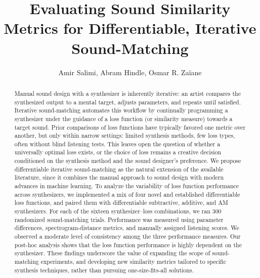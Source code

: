 \documentclass[lettersize,journal]{IEEEtran}
\providecommand{\DIFaddbegin}{} %
\providecommand{\DIFaddend}{} %
\providecommand{\DIFdelbegin}{} %
\providecommand{\DIFdelend}{} %
\providecommand{\DIFscaledelfig}{0.5}
\newlength{\DIFdelgraphicswidth} %
\newlength{\DIFdelgraphicsheight} %
\providecommand{\DIFaddincludegraphics}[2][]{{\color{blue}\fbox{\DIFOincludegraphics[#1]{#2}}}} %
\providecommand{\DIFdelincludegraphics}[2][]{%
\sbox{\DIFdelgraphicsbox}{\DIFOincludegraphics[#1]{#2}}%
\settoboxwidth{\DIFdelgraphicswidth}{\DIFdelgraphicsbox} %
\settoboxtotalheight{\DIFdelgraphicsheight}{\DIFdelgraphicsbox} %
\scalebox{\DIFscaledelfig}{%
\parbox[b]{\DIFdelgraphicswidth}{\usebox{\DIFdelgraphicsbox}\\[-\baselineskip] \rule{\DIFdelgraphicswidth}{0em}}\llap{\resizebox{\DIFdelgraphicswidth}{\DIFdelgraphicsheight}{%
\setlength{\unitlength}{\DIFdelgraphicswidth}%
\begin{picture}(1,1)%
\thicklines\linethickness{2pt} %
{\color[rgb]{1,0,0}\put(0,0){\framebox(1,1){}}}%
{\color[rgb]{1,0,0}\put(0,0){\line( 1,1){1}}}%
{\color[rgb]{1,0,0}\put(0,1){\line(1,-1){1}}}%
\end{picture}%
}\hspace*{3pt}}} %
} %
\DeclareRobustCommand{\DIFaddbegin}{\DIFOaddbegin \let\includegraphics\DIFaddincludegraphics} %
\DeclareRobustCommand{\DIFaddend}{\DIFOaddend \let\includegraphics\DIFOincludegraphics} %
\DeclareRobustCommand{\DIFdelbegin}{\DIFOdelbegin \let\includegraphics\DIFdelincludegraphics} %
\DeclareRobustCommand{\DIFdelend}{\DIFOaddend \let\includegraphics\DIFOincludegraphics} %
\begin{document}
\DIFaddbegin 


\DIFaddend \title{Evaluating Sound Similarity Metrics for Differentiable, Iterative Sound-Matching}

\author{Amir Salimi, Abram Hindle, Osmar R. Za{\"i}ane}
\DIFdelbegin %



\DIFdelend \maketitle

 
\begin{abstract}
Manual sound design with a synthesizer is inherently iterative: an artist compares the synthesized output to a mental target, adjusts parameters, and repeats until satisfied. Iterative sound-matching automates this workflow by continually programming a synthesizer under the guidance of a loss function (or similarity measure) towards a target sound. Prior comparisons of loss functions have typically favored one metric over another, but only within narrow settings: limited synthesis methods, few loss types, often without blind listening tests. This leaves open the question of whether a universally optimal loss exists, or the choice of loss remains a creative decision conditioned on the synthesis method and the sound designer's preference. We propose differentiable iterative sound-matching as the natural extension of the available literature, since it combines the manual approach to sound design with modern advances in machine learning. To analyze the variability of loss function performance across synthesizers, we implemented a mix of four novel and established differentiable loss functions, and paired them with differentiable subtractive, additive, and AM synthesizers. For each of the sixteen synthesizer–loss combinations, we ran 300 randomized sound-matching trials. Performance was measured using parameter differences, spectrogram-distance metrics, and manually assigned listening scores. We observed a moderate level of consistency among the three performance measures. Our post-hoc analysis shows that the loss function performance is highly dependent on the synthesizer. These findings underscore the value of expanding the scope of sound-matching experiments, and developing new similarity metrics tailored to specific synthesis techniques, rather than pursuing one-size-fits-all solutions.
\end{abstract}
\DIFdelbegin %
\end{document}
